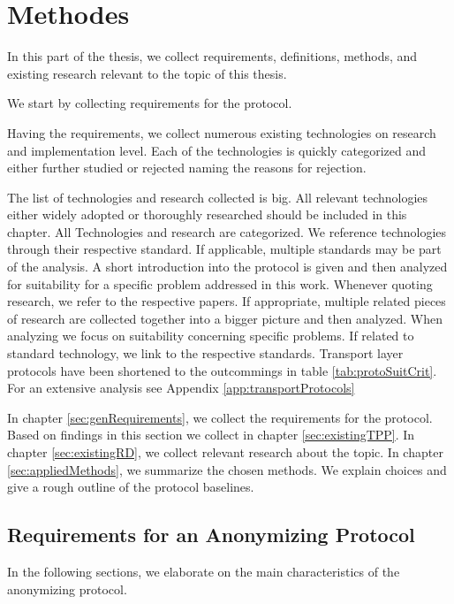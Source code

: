 

\part{Methodes}
In this part of the thesis, we collect requirements, definitions, methods, and existing research relevant to the topic of this thesis. 

We start by collecting requirements for the protocol.

Having the requirements, we collect numerous existing technologies on research and implementation level. Each of the technologies is quickly categorized and either further studied or rejected naming the reasons for rejection.

The list of technologies and research collected is big. All relevant technologies either widely adopted or thoroughly researched should be included in this chapter. All Technologies and research are categorized. We reference technologies through their respective standard. If applicable, multiple standards may be part of the analysis. A short introduction into the protocol is given and then analyzed for suitability for a specific problem addressed in this work. Whenever quoting research, we refer to the respective papers. If appropriate, multiple related pieces of research are collected together into a bigger picture and then analyzed. When analyzing we focus on suitability concerning specific problems. If related to standard technology, we link to the respective standards. Transport layer protocols have been shortened to the outcommings in table \ref{tab:protoSuitCrit}. For an extensive analysis see Appendix \ref{app:transportProtocols}

In chapter \ref{sec:genRequirements}, we collect the requirements for the protocol. Based on findings in this section we collect in chapter \ref{sec:existingTPP}. In chapter \ref{sec:existingRD}, we collect relevant research about the topic. In chapter \ref{sec:appliedMethods}, we summarize the chosen methods. We explain choices and give a rough outline of the protocol baselines.

\chapter{Requirements for an Anonymizing Protocol\label{sec:genRequirements}}
In the following sections, we elaborate on the main characteristics of the anonymizing protocol. 

